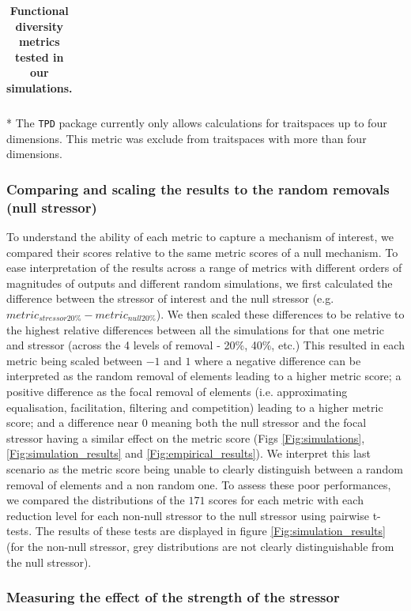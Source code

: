 \documentclass[12pt,letterpaper]{article}
\begin{document}
\begin{table}
\begin{tabular}{p{0.1\linewidth}|p{0.15\linewidth}|p{0.15\linewidth}|p{0.2\linewidth}|p{0.15\linewidth}|p{0.1\linewidth}}
\end{tabular}
\caption{\scriptsize{\textbf{Functional diversity metrics tested in our simulations.}}
}
\label{Tab:metrics}
* The \texttt{TPD} package currently only allows calculations for traitspaces up to four dimensions. This metric was exclude from traitspaces with more than four dimensions.
\end{table}

\subsubsection{Comparing and scaling the results to the random removals (null stressor)}

To understand the ability of each metric to capture a mechanism of interest, we compared their scores relative to the same metric scores of a null mechanism.
To ease interpretation of the results across a range of metrics with different orders of magnitudes of outputs and different random simulations, we first calculated the difference between the stressor of interest and the null stressor (e.g. $metric_{stressor20\%} - metric_{null20\%}$).
We then scaled these differences to be relative to the highest relative differences between all the simulations for that one metric and stressor (across the 4 levels of removal - 20\%, 40\%, etc.)
This resulted in each metric being scaled between $-1$ and $1$ where a negative difference can be interpreted as the random removal of elements leading to a higher metric score; a positive difference as the focal removal of elements (i.e. approximating equalisation, facilitation, filtering and competition) leading to a higher metric score; and a difference near $0$ meaning both the null stressor and the focal stressor having a similar effect on the metric score (Figs \ref{Fig:simulations}, \ref{Fig:simulation_results} and \ref{Fig:empirical_results}).
We interpret this last scenario as the metric score being unable to clearly distinguish between a random removal of elements and a non random one.
To assess these poor performances, we compared the distributions of the $171$ scores for each metric with each reduction level for each non-null stressor to the null stressor using pairwise t-tests.
The results of these tests are displayed in figure \ref{Fig:simulation_results} (for the non-null stressor, grey distributions are not clearly distinguishable from the null stressor).

\subsubsection{Measuring the effect of the strength of the stressor}
\end{document}
